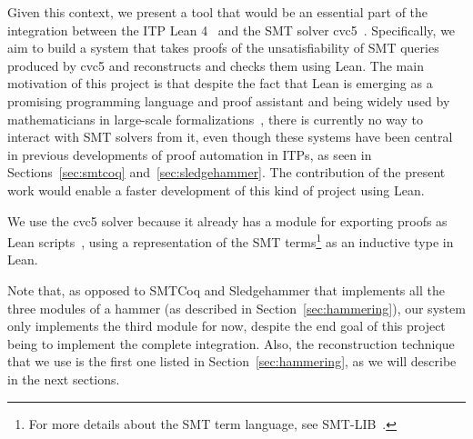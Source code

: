 Given this context, we present a tool that would be an essential
part of the integration between the ITP Lean 4~\cite{lean} and the SMT solver cvc5~\cite{cvc5}.
%
Specifically, we aim to build a system that takes proofs of the unsatisfiability of
SMT queries produced by cvc5 and reconstructs and checks them using Lean.
%
The main motivation of this project is that despite the fact that Lean is
emerging as a promising programming language and proof assistant and being
widely used by mathematicians in large-scale
formalizations~\cite{mathlib, scholze}, there is currently no way to
interact with SMT solvers from it, even though these systems have been
central in previous developments of proof automation in ITPs, as seen in Sections~\ref{sec:smtcoq}
and~\ref{sec:sledgehammer}. The contribution of the present work
would enable a faster development of this kind of project using Lean.

We use the cvc5 solver because it already has a module for exporting proofs as
Lean scripts~\cite{Barbosa2022}, using a representation of the SMT terms\footnote{For more details
about the SMT term language, see SMT-LIB~\cite{smtlib}.} as an inductive type in Lean.

Note that, as opposed to SMTCoq and Sledgehammer that implements all the three modules
of a hammer (as described in Section~\ref{sec:hammering}), our system only implements
the third module for now, despite the end goal of this project being to implement the
complete integration. Also, the reconstruction technique that we use is the first one
listed in Section~\ref{sec:hammering}, as we will describe in the next sections.
